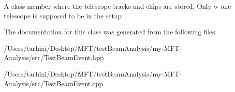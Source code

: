 A class member where the telescope tracks and chips are stored. Only w-\/one telescope is supposed to be in the setup 

The documentation for this class was generated from the following files\+:\begin{DoxyCompactItemize}
\item 
/\+Users/tarhini/\+Desktop/\+M\+F\+T/test\+Beam\+Analysis/my-\/\+M\+F\+T-\/\+Analysis/src/Test\+Beam\+Event.\+hpp\item 
/\+Users/tarhini/\+Desktop/\+M\+F\+T/test\+Beam\+Analysis/my-\/\+M\+F\+T-\/\+Analysis/src/Test\+Beam\+Event.\+cpp\end{DoxyCompactItemize}
